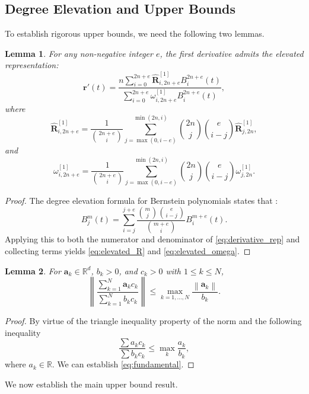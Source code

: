\documentclass[preprint,12pt]{elsarticle}
\newcommand{\norm}[1]{\left\lVert #1 \right\rVert}
\newtheorem{Lemma}{Lemma}
\begin{document}
\subsection{Degree Elevation and Upper Bounds}

To establish rigorous upper bounds, we need the following two lemmas.

\begin{Lemma}\label{lem:elevation}
For any non-negative integer $e$, the first derivative admits the elevated representation:
\begin{equation}\label{eq:elevated}
\mathbf{r}'(t) = \frac{n \sum_{i=0}^{2n+e} \widehat{\mathbf{R}}^{[1]}_{i,2n+e} B^{2n+e}_i(t)}{\sum_{i=0}^{2n+e} \omega^{[1]}_{i,2n+e} B^{2n+e}_i(t)},
\end{equation}
where
\begin{equation}\label{eq:elevated_R}
\widehat{\mathbf{R}}^{[1]}_{i,2n+e} = \frac{1}{\binom{2n+e}{i}} \sum_{j=\max(0,i-e)}^{\min(2n,i)} \binom{2n}{j}\binom{e}{i-j} \widehat{\mathbf{R}}^{[1]}_{j,2n},
\end{equation}
and
\begin{equation}\label{eq:elevated_omega}
\omega^{[1]}_{i,2n+e} = \frac{1}{\binom{2n+e}{i}} \sum_{j=\max(0,i-e)}^{\min(2n,i)} \binom{2n}{j}\binom{e}{i-j} \omega^{[1]}_{j,2n}.
\end{equation}
\end{Lemma}

\begin{proof}
The degree elevation formula for Bernstein polynomials states that \cite{Farouki1988}:
\[
B^m_j(t) = \sum_{i=j}^{j+e} \frac{\binom{m}{j}\binom{e}{i-j}}{\binom{m+e}{i}} B^{m+e}_i(t).
\]
Applying this to both the numerator and denominator of \eqref{eq:derivative_rep} and collecting terms yields \eqref{eq:elevated_R} and \eqref{eq:elevated_omega}.
\end{proof}

\begin{Lemma}
For $\textbf{a}_k \in \mathbb{R}^d$, $b_k > 0$, and $c_k > 0$ with $1 \leq k \leq N$,
\begin{equation}\label{eq:fundamental}
\norm{ \frac{\sum_{k=1}^N \textbf{{a}}_k c_k}{\sum_{k=1}^N b_k c_k} } \leq \max_{k=1,\ldots,N} \frac{\norm{\textbf{a}_k}}{b_k}.
\end{equation}
\end{Lemma}
\begin{proof}
By virtue of the triangle inequality property of the norm and the following inequality \cite{Mitrinovic1970,Kuang1989}
\[
\frac{\sum a_k c_k}{\sum b_k c_k} \leqslant \max_k \frac{a_k}{b_k},
\]
where $a_k \in \mathbb{R}$. We can establish  \eqref{eq:fundamental}.
\end{proof}
We now establish the main upper bound result.
\end{document}
